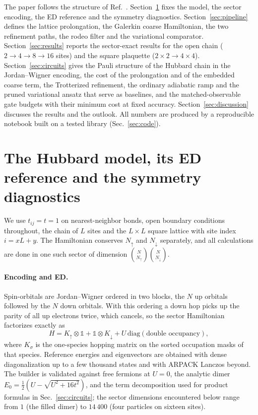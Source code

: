 \documentclass[
  aps,
  prc,
  reprint,
  superscriptaddress,
  floatfix,
  nofootinbib
]{revtex4-2}
\begin{document}
The paper follows the structure of Ref.~\cite{EigenQPairing2026}.
Section~\ref{sec:model} fixes the model, the sector encoding, the ED
reference and the symmetry diagnostics.  Section~\ref{sec:pipeline} defines
the lattice prolongation, the Galerkin coarse Hamiltonian, the two refinement
paths, the rodeo filter and the variational comparator.
Section~\ref{sec:results} reports the sector-exact results for the open chain
($2\to4\to8\to16$ sites) and the square plaquette ($2\times2\to4\times4$).
Section~\ref{sec:circuits} gives the Pauli structure of the Hubbard chain in
the Jordan--Wigner encoding, the cost of the prolongation and of the embedded
coarse term, the Trotterized refinement, the ordinary adiabatic ramp and the
pruned variational ansatz that serve as baselines, and the matched-observable
gate budgets with their minimum cost at fixed accuracy.
Section~\ref{sec:discussion} discusses the results and the outlook.  All
numbers are produced by a reproducible notebook built on a tested library
(Sec.~\ref{sec:code}).

\section{The Hubbard model, its ED reference and the symmetry diagnostics}
\label{sec:model}
We use $t_{ij}=t=1$ on nearest-neighbor bonds, open boundary conditions
throughout, the chain of $L$ sites and the $L\times L$ square lattice with
site index $i=xL+y$.  The Hamiltonian conserves $N_\uparrow$ and
$N_\downarrow$ separately, and all calculations are done in one such sector
of dimension $\binom{N}{N_\uparrow}\binom{N}{N_\downarrow}$.

\paragraph{Encoding and ED.}
Spin-orbitals are Jordan--Wigner ordered in two blocks, the $N$ up orbitals
followed by the $N$ down orbitals.  With this ordering a down hop picks up
the parity of all up electrons twice, which cancels, so the sector
Hamiltonian factorizes exactly as
\begin{equation}
  H=K_\uparrow\otimes\mathbb 1+\mathbb 1\otimes K_\downarrow
   +U\,\mathrm{diag}(\text{double occupancy}),
  \label{eq:kron}
\end{equation}
where $K_\sigma$ is the one-species hopping matrix on the sorted occupation
masks of that species.  Reference energies and eigenvectors are obtained
with dense diagonalization up to a few thousand states and with ARPACK
Lanczos beyond.  The builder is validated against free fermions at $U=0$,
the analytic dimer $E_0=\tfrac12(U-\sqrt{U^2+16t^2})$, and the term
decomposition used for product formulas in Sec.~\ref{sec:circuits}; the
sector dimensions encountered below range from $1$ (the filled dimer) to
$14\,400$ (four particles on sixteen sites).
\end{document}
